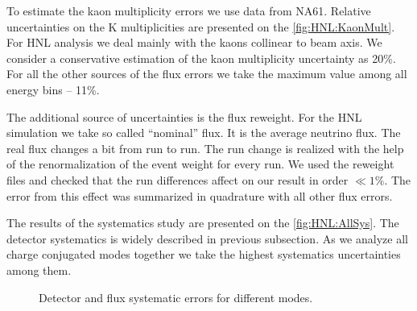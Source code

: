\documentclass[../main.tex]{subfiles}
\begin{document}
To estimate the kaon multiplicity errors we use data from NA61. Relative uncertainties on the K multiplicities are presented on the \autoref{fig:HNL:KaonMult}. For HNL analysis we deal mainly with the kaons collinear to beam axis. We consider a conservative estimation of the kaon multiplicity uncertainty as 20\%. For all the other sources of the flux errors we take the maximum value among all energy bins -- 11\%.


The additional source of uncertainties is the flux reweight. For the HNL simulation we take so called ``nominal'' flux. It is the average neutrino flux. The real flux changes a bit from run to run. The run change is realized with the help of the renormalization of the event weight for every run. We used the reweight files and checked that the run differences affect on our result in order $\ll1\%$. The error from this effect was summarized in quadrature with all other flux errors.

The results of the systematics study are presented on the \autoref{fig:HNL:AllSys}. The detector systematics is widely described in previous subsection. As we analyze all charge conjugated modes together we take the highest systematics uncertainties among them.

\begin{figure}[!ht]
    \begin{center}
    \begin{minipage}{0.49\linewidth}
    \end{minipage}
    \hfill
    \begin{minipage}{0.49\linewidth}
    \end{minipage}
    \vfill
    \begin{minipage}{0.49\linewidth}
    \end{minipage}
    \caption{Detector and flux systematic errors for different modes.}
    \label{fig:HNL:AllSys}
        \end{center}
\end{figure}
\end{document}
